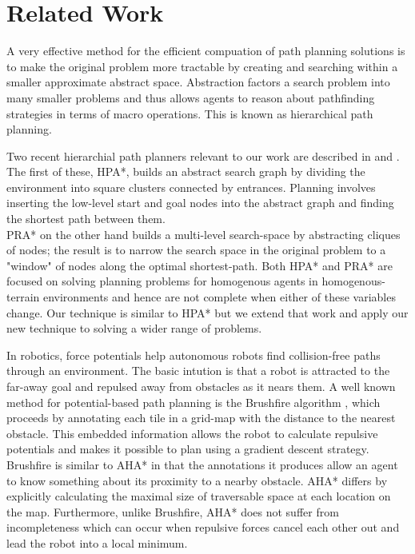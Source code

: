 \section{Related Work}
A very effective method for the efficient compuation of path planning solutions is to make the original problem more tractable by creating and searching within a smaller approximate abstract space. Abstraction factors a search problem into many smaller problems and thus allows agents to reason about pathfinding strategies in terms of macro operations. This is known as hierarchical path planning. 
\par
\indent Two recent hierarchial path planners relevant to our work are described in \cite{botea04} and \cite{sturtevant05}. The first of these, HPA*, builds an  abstract search graph by dividing the environment into square clusters connected by entrances. Planning involves inserting the low-level start and goal nodes into the abstract graph and finding the shortest path between them. \\
PRA* on the other hand builds a multi-level search-space by abstracting cliques of nodes; the result is to narrow the search space in the original problem to a "window" of nodes along the optimal shortest-path.
Both HPA* and PRA* are focused on solving planning problems for homogenous agents in homogenous-terrain environments and hence are not complete when either of these variables change. 
Our technique is similar to HPA* but we extend that work and apply our new technique to solving a wider range of problems. 
\par 
\indent In robotics, force potentials help autonomous robots find collision-free paths through an environment. The basic intution is that a robot is attracted to the far-away goal and repulsed away from obstacles as it nears them. A well known method for potential-based path planning is the Brushfire algorithm \cite{latombe91}, which proceeds by annotating each tile in a grid-map with the distance to the nearest obstacle. This embedded information allows the robot to calculate repulsive potentials and makes it possible to plan using a gradient descent strategy. 
Brushfire is similar to AHA* in that the annotations it produces allow an agent to know something about its proximity to a nearby obstacle. 
AHA* differs by explicitly calculating the maximal size of traversable space at each location on the map. 
Furthermore, unlike Brushfire, AHA* does not suffer from incompleteness which can occur when repulsive forces cancel each other out and lead the robot into a local minimum. 
